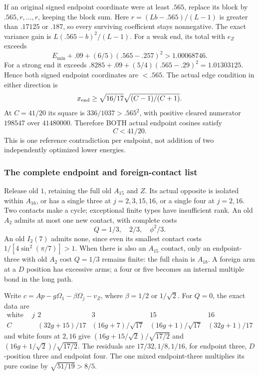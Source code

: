 If an original signed endpoint coordinate were at least \(.565\),
replace its block by \(.565,r,\ldots,r\), keeping the block sum.
Here \(r=(Lb-.565)/(L-1)\) is greater than \(.17125\) or
\(.187\), so every surviving coefficient stays nonnegative.
The exact variance gain is \(L(.565-b)^2/(L-1)\).
For a weak end, its total with \(e_Z\) exceeds
\[
 E_{\min}+.09+(6/5)(.565-.257)^2>1.00068746.
\]
For a strong end it exceeds
\(.8285+.09+(5/4)(.565-.29)^2=1.01303125\).
Hence both signed endpoint coordinates are \(<.565\).
The actual edge condition in either direction is
\[
 x_{\rm end}\ge\sqrt{16/17}\sqrt{(C-1)/(C+1)}.
\]
At \(C=41/20\) its square is \(336/1037>.565^2\), with
positive cleared numerator \(198547\) over \(41480000\).
Therefore BOTH actual endpoint cosines satisfy
\[
                         C<41/20.                         \tag{T4}
\]
This is one reference contradiction per endpoint, not addition of
two independently optimized lower energies.

\subsubsection{The complete endpoint and foreign-contact list}
Release old \(1\), retaining the full old \(A_{15}\) and \(Z\).
Its actual opposite is isolated within \(A_{16}\), or has a single
three at \(j=2,3,15,16\), or a single four at \(j=2,16\).
Two contacts make a cycle; exceptional finite types have insufficient rank.
An old \(A_2\) admits at most one new contact, with complete costs
\[
                  Q=1/3,\quad2/3,\quad\phi^2/3.
\]
An old \(I_2(7)\) admits none, since even its smallest contact costs
\(1/[4\sin^2(\pi/7)]>1\).
When there is also an \(A_{15}\) contact, only an endpoint-three
with old \(A_2\) cost \(Q=1/3\) remains finite: the full chain
is \(A_{18}\).  A foreign arm at a \(D\) position has excessive
arms; a four or five becomes an internal multiple bond in the long path.

Write \(c=Ap-g\Omega_1-\beta\Omega_j-v_Z\), where
\(\beta=1/2\) or \(1/\sqrt2\).  For \(Q=0\), the exact data are
\[
\begin{array}{c|rrrr}
 \text{white three at }j&2&3&15&16\\ \hline
 C&(32g+15)/17&(16g+7)/\sqrt{17}&
   (16g+1)/\sqrt{17}&(32g+1)/17
\end{array}
\]
and white fours at \(2,16\) give
\((16g+15/\sqrt2)/\sqrt{17/2}\) and
\((16g+1/\sqrt2)/\sqrt{17/2}\).
The residuals are \(17/32,1/8,1/16\), for endpoint three,
\(D\)-position three and endpoint four.  The one mixed
endpoint-three multiplies its pure cosine by \(\sqrt{51/19}>8/5\).

